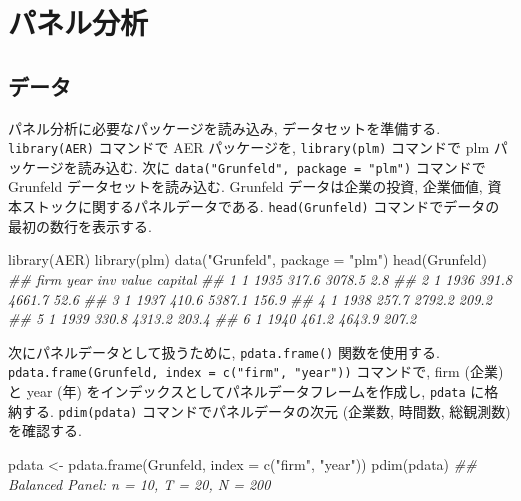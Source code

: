 \documentclass[
  letterpaper,
  xelatex,
  ja=standard, xelatex]{bxjsbook}
\newenvironment{Shaded}{\begin{snugshade}}{\end{snugshade}}
\newcommand{\AttributeTok}[1]{\textcolor[rgb]{0.40,0.45,0.13}{#1}}
\newcommand{\DocumentationTok}[1]{\textcolor[rgb]{0.37,0.37,0.37}{\textit{#1}}}
\newcommand{\FunctionTok}[1]{\textcolor[rgb]{0.28,0.35,0.67}{#1}}
\newcommand{\NormalTok}[1]{\textcolor[rgb]{0.00,0.23,0.31}{#1}}
\newcommand{\OtherTok}[1]{\textcolor[rgb]{0.00,0.23,0.31}{#1}}
\newcommand{\StringTok}[1]{\textcolor[rgb]{0.13,0.47,0.30}{#1}}
\begin{document}
\chapter{パネル分析}\label{ux30d1ux30cdux30ebux5206ux6790}

\section{データ}\label{ux30c7ux30fcux30bf-1}

パネル分析に必要なパッケージを読み込み, データセットを準備する.
\texttt{library(AER)} コマンドで AER パッケージを, \texttt{library(plm)}
コマンドで plm パッケージを読み込む. 次に
\texttt{data("Grunfeld",\ package\ =\ "plm")} コマンドで Grunfeld
データセットを読み込む. Grunfeld データは企業の投資, 企業価値,
資本ストックに関するパネルデータである. \texttt{head(Grunfeld)}
コマンドでデータの最初の数行を表示する.

\begin{Shaded}
\begin{Highlighting}[]
\FunctionTok{library}\NormalTok{(AER)}
\FunctionTok{library}\NormalTok{(plm)}
\FunctionTok{data}\NormalTok{(}\StringTok{"Grunfeld"}\NormalTok{, }\AttributeTok{package =} \StringTok{"plm"}\NormalTok{)}
\FunctionTok{head}\NormalTok{(Grunfeld)}
\DocumentationTok{\#\#   firm year   inv  value capital}
\DocumentationTok{\#\# 1    1 1935 317.6 3078.5     2.8}
\DocumentationTok{\#\# 2    1 1936 391.8 4661.7    52.6}
\DocumentationTok{\#\# 3    1 1937 410.6 5387.1   156.9}
\DocumentationTok{\#\# 4    1 1938 257.7 2792.2   209.2}
\DocumentationTok{\#\# 5    1 1939 330.8 4313.2   203.4}
\DocumentationTok{\#\# 6    1 1940 461.2 4643.9   207.2}
\end{Highlighting}
\end{Shaded}

次にパネルデータとして扱うために, \texttt{pdata.frame()} 関数を使用する.
\texttt{pdata.frame(Grunfeld,\ index\ =\ c("firm",\ "year"))}
コマンドで, firm (企業) と year (年)
をインデックスとしてパネルデータフレームを作成し, \texttt{pdata}
に格納する. \texttt{pdim(pdata)} コマンドでパネルデータの次元 (企業数,
時間数, 総観測数) を確認する.

\begin{Shaded}
\begin{Highlighting}[]
\NormalTok{pdata }\OtherTok{\textless{}{-}} \FunctionTok{pdata.frame}\NormalTok{(Grunfeld, }\AttributeTok{index =} \FunctionTok{c}\NormalTok{(}\StringTok{"firm"}\NormalTok{, }\StringTok{"year"}\NormalTok{))}
\FunctionTok{pdim}\NormalTok{(pdata)}
\DocumentationTok{\#\# Balanced Panel: n = 10, T = 20, N = 200}
\end{Highlighting}
\end{Shaded}
\end{document}
